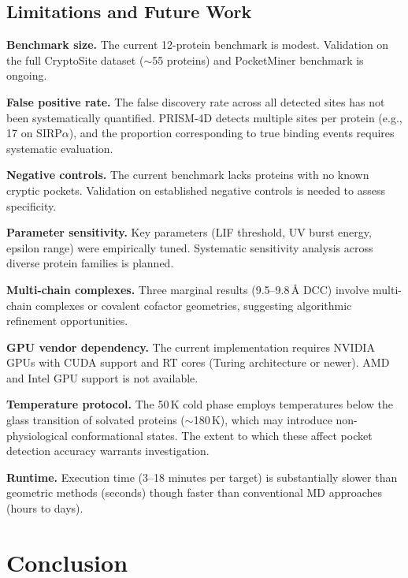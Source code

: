 \documentclass[11pt,twocolumn]{article}
\begin{document}
\subsection{Limitations and Future Work}

\textbf{Benchmark size.} The current 12-protein benchmark is modest. Validation on the full
CryptoSite dataset \citep{cimermancic2016} ($\sim$55 proteins) and PocketMiner benchmark
\citep{meller2023} is ongoing.

\textbf{False positive rate.} The false discovery rate across all detected sites has not been
systematically quantified. PRISM-4D detects multiple sites per protein (e.g., 17 on
SIRP$\alpha$), and the proportion corresponding to true binding events requires systematic
evaluation.

\textbf{Negative controls.} The current benchmark lacks proteins with no known cryptic
pockets. Validation on established negative controls is needed to assess specificity.

\textbf{Parameter sensitivity.} Key parameters (LIF threshold, UV burst energy, epsilon
range) were empirically tuned. Systematic sensitivity analysis across diverse protein
families is planned.

\textbf{Multi-chain complexes.} Three marginal results (9.5--9.8\,\AA{} DCC) involve
multi-chain complexes or covalent cofactor geometries, suggesting algorithmic refinement
opportunities.

\textbf{GPU vendor dependency.} The current implementation requires NVIDIA GPUs with CUDA
support and RT cores (Turing architecture or newer). AMD and Intel GPU support is not
available.

\textbf{Temperature protocol.} The 50\,K cold phase employs temperatures below the glass
transition of solvated proteins ($\sim$180\,K), which may introduce non-physiological
conformational states. The extent to which these affect pocket detection accuracy warrants
investigation.

\textbf{Runtime.} Execution time (3--18 minutes per target) is substantially slower than
geometric methods (seconds) though faster than conventional MD approaches (hours to days).

\section{Conclusion}
\end{document}
